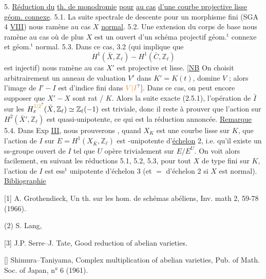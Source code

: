 5. \uline{Réduction du} \uline{th. de monodromie} \uline{pour}   \uline{au cas} \uline{d'une courbe projective lisse} \uline{géom. connexe}.
5.1. La suite spectrale de descente   pour un morphisme fini (SGA 4 \uline{VIII}) nous ramène au cas $X$ \uline{normal}.
5.2.  Une extension   du corps de base nous ramène au cas où de plus $X$ est un ouvert d'un schéma projectif   géom.$^{\mathrm t}$ connexe et géom.$^{\mathrm t}$ normal.
5.3. Dans ce cas, 3.2 (qui implique que
\[H^1(\bar X,\mathbb Z_\ell)-H^1(\bar C,\mathbb Z_\ell)\]
est injectif) nous ramène au cas  $X'$ est   projective et lisse.
[\uline{NB}  On choisit arbitrairement un anneau de valuation $V'$ dans $K'=K(t)$,  domine $V$ \unsure{\}}; alors l'image de $I'-I$ est d'indice fini dans $\unsure{V|I}$].
Dans ce cas,  on peut encore supposer que  $X'-X$ sont rat / $K$. Alors  la suite exacte (2.5.1), l'opération de $\bar I$ sur les $H^{\unsure{1|2}}_x(\bar X,\mathbb Z_\ell)\simeq\mathbb Z_\ell(-1)$ est triviale, donc il reste à prouver que l'action sur $H^2(\bar X',\mathbb Z_\ell)$ est quasi-unipotente, ce qui est la réduction annoncée.
\uline{Remarque} 5.4. Dans Exp \uline{III}, nous prouverons \unsure{$=$|$\simeq$}, quand $X_K$ est une courbe   lisse sur $K$, que l'action de $I$ sur $E=H^1(X_{\bar K},\mathbb Z_\ell)$ est -unipotente d'\uline{échelon} 2, i.e. qu'il existe un ss-groupe ouvert   de $I$ tel que  $U$ opère  trivialement sur  $E/E^U$.
On voit alors facilement, en suivant les réductions 5.1, 5.2, 5.3,  pour tout  $X$  de type fini sur $K$, l'action de $I$ est  ess$^{\mathrm t}$ unipotente d'échelon 3 (et $=$ d'échelon 2  si $X$ est normal).
\uline{Bibliographie}

[1] A. Grothendieck, Un th. sur les hom. de schémas abéliens, Inv. math 2, 59-78 (1966).

(2) S. Lang,

[3] J.P. Serre--J. Tate, Good reduction of abelian varieties.

[] Shimura--Taniyama, Complex multiplication of abelian varieties, Pub. of Math. Soc. of Japan, n° 6 (1961).

